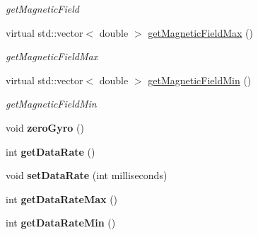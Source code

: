 \begin{DoxyCompactItemize}
\begin{DoxyCompactList}\small\item\em get\-Magnetic\-Field \end{DoxyCompactList}\item 
virtual std\-::vector$<$ double $>$ \hyperlink{classdrobot_1_1device_1_1vestibular_1_1PhidgetVestibular_a1281363ecdc21919d04904cb2d3c3e2c}{get\-Magnetic\-Field\-Max} ()
\begin{DoxyCompactList}\small\item\em get\-Magnetic\-Field\-Max \end{DoxyCompactList}\item 
virtual std\-::vector$<$ double $>$ \hyperlink{classdrobot_1_1device_1_1vestibular_1_1PhidgetVestibular_adb71ac894232a61e286e5d374e30d09d}{get\-Magnetic\-Field\-Min} ()
\begin{DoxyCompactList}\small\item\em get\-Magnetic\-Field\-Min \end{DoxyCompactList}\item 
\hypertarget{classdrobot_1_1device_1_1vestibular_1_1PhidgetVestibular_a7d5ff6fbd49ad5754da22a14d6073dec}{void {\bfseries zero\-Gyro} ()}\label{classdrobot_1_1device_1_1vestibular_1_1PhidgetVestibular_a7d5ff6fbd49ad5754da22a14d6073dec}

\item 
\hypertarget{classdrobot_1_1device_1_1vestibular_1_1PhidgetVestibular_a1cbfe1342ff68d9e6c0b1b031e18cc4e}{int {\bfseries get\-Data\-Rate} ()}\label{classdrobot_1_1device_1_1vestibular_1_1PhidgetVestibular_a1cbfe1342ff68d9e6c0b1b031e18cc4e}

\item 
\hypertarget{classdrobot_1_1device_1_1vestibular_1_1PhidgetVestibular_af712368b99f59ea188455fdc4e1318fd}{void {\bfseries set\-Data\-Rate} (int milliseconds)}\label{classdrobot_1_1device_1_1vestibular_1_1PhidgetVestibular_af712368b99f59ea188455fdc4e1318fd}

\item 
\hypertarget{classdrobot_1_1device_1_1vestibular_1_1PhidgetVestibular_ab474df478e3bea1a3c92b76ada0abea8}{int {\bfseries get\-Data\-Rate\-Max} ()}\label{classdrobot_1_1device_1_1vestibular_1_1PhidgetVestibular_ab474df478e3bea1a3c92b76ada0abea8}

\item 
\hypertarget{classdrobot_1_1device_1_1vestibular_1_1PhidgetVestibular_af7265613db2b247eef6db456108388da}{int {\bfseries get\-Data\-Rate\-Min} ()}\label{classdrobot_1_1device_1_1vestibular_1_1PhidgetVestibular_af7265613db2b247eef6db456108388da}


\end{DoxyCompactItemize}
